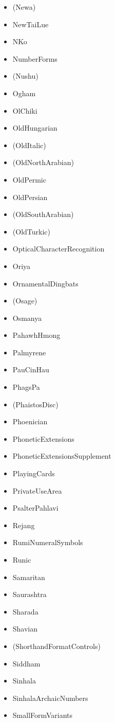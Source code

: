 ﻿\documentclass{article}
\newenvironment{itemlist}{%
  \begin{itemize}
	\setlength{\itemsep}{0pt}
	\setlength{\parsep}{0pt}
	\setlength{\topsep}{0pt}
	\setlength{\partopsep}{0pt}
	\setlength{\parskip}{0pt}
	\setlength{\labelsep}{5pt}}%
{
  \end{itemize}}
\begin{document}
\begin{multicols}{2}
\begin{itemlist}
				\item (Newa)
				\item NewTaiLue
				\item NKo
				\item NumberForms
				\item (Nushu)
				\item Ogham
				\item OlChiki
				\item OldHungarian
				\item (OldItalic)
				\item (OldNorthArabian)
				\item OldPermic
				\item OldPersian
				\item (OldSouthArabian)
				\item (OldTurkic)
				\item OpticalCharacterRecognition
				\item Oriya
				\item OrnamentalDingbats
				\item (Osage)
				\item Osmanya
				\item PahawhHmong
				\item Palmyrene
				\item PauCinHau
				\item PhagsPa
				\item (PhaistosDisc)
				\item Phoenician
				\item PhoneticExtensions
				\item PhoneticExtensionsSupplement
				\item PlayingCards
				\item PrivateUseArea
				\item PsalterPahlavi
				\item Rejang
				\item RumiNumeralSymbols
				\item Runic
				\item Samaritan
				\item Saurashtra
				\item Sharada
				\item Shavian
				\item (ShorthandFormatControls)
				\item Siddham
				\item Sinhala
				\item SinhalaArchaicNumbers
				\item SmallFormVariants

\end{itemlist}
\end{multicols}
\end{document}
